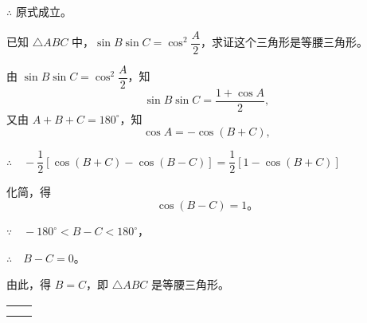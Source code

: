 $\therefore$ 原式成立。

\liti 已知 $\triangle ABC$ 中，$\sin B \sin C = \cos^2 \dfrac{A}{2}$，求证这个三角形是等腰三角形。

\zhengming 由 $\sin B \sin C = \cos^2 \dfrac{A}{2}$，知
$$\sin B \sin C = \dfrac{1 + \cos A}{2} ,$$
又由 $A + B + C = 180^\circ$，知
$$\cos A = -\cos(B + C),$$

$\therefore \quad -\dfrac{1}{2}[\cos(B+C) - \cos(B-C)] = \dfrac{1}{2}[1 - \cos(B+C)]$ \jiange

化简，得
$$\cos(B-C) = 1 \text{。}$$

$\because \quad -180^\circ < B - C < 180^\circ$，

$\therefore \quad B - C = 0$。

由此，得 $B = C$，即 $\triangle ABC$ 是等腰三角形。

\lianxi
\begin{xiaotis}

\begin{xiaoxiaotis}

    \begin{tabular}[t]{*{2}{@{}p{16em}}}
         &  \\
         & 
    \end{tabular}

\end{xiaoxiaotis}

\begin{xiaoxiaotis}

    \jiange

    \jiange

\end{xiaoxiaotis}

\begin{xiaoxiaotis}

    \jiange
    \jiange

    \jiange

    \jiange


    \jiange

    \jiange

\end{xiaoxiaotis}
\end{xiaotis}


